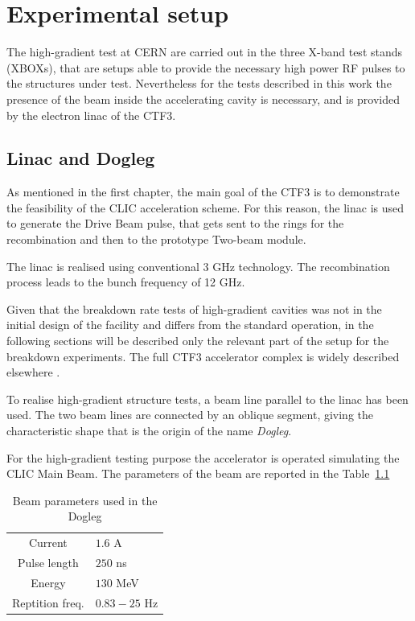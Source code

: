 \chapter[Experimental setup]{Experimental setup}
\label{chap:setup}

The high-gradient test at CERN are carried out in the three X-band test stands (XBOXs), that are setups able to provide the necessary high power RF pulses to the structures under test. Nevertheless for the tests described in this work the presence of the beam inside the accelerating cavity is necessary, and is provided by the electron linac of the CTF3. 


\section[Linac and dogleg]{Linac and Dogleg}

As mentioned in the first chapter, the main goal of the CTF3 is to demonstrate the feasibility of the CLIC acceleration scheme. For this reason, the linac is used to generate the Drive Beam pulse, that gets sent to the rings for the recombination and then to the prototype Two-beam module. 

The linac is realised using conventional 3 GHz technology. The recombination process leads to the bunch frequency of 12 GHz. 

Given that the breakdown rate tests of high-gradient cavities was not in the initial design of the facility and differs from the standard operation, in the following sections will be described only the relevant part of the setup for the breakdown experiments. The full CTF3 accelerator complex is widely described elsewhere \cite{CLIC:cdr,CTF:drive_beam,ctf3:dr}. 

To realise high-gradient structure tests, a beam line parallel to the linac has been used. The two beam lines are connected by an oblique segment, giving the characteristic shape that is the origin of the name \textit{Dogleg}.

For the high-gradient testing purpose the accelerator is operated simulating the CLIC Main Beam. The parameters of the beam are reported in the Table~\ref{beam_par_dogleg}


\begin{table}
  \centering
    \begin{tabular}{ c l }
    \hline
    \hline
    Current 		&	$1.6$ A\\
    Pulse length		&	$250$ ns\\
    Energy			&	$130$ MeV\\
    Reptition freq.	&	$0.83-25$ Hz\\
    \hline
    \hline
    \end{tabular}
\caption{Beam parameters used in the Dogleg \cite{NavarroQuirante:2025954}}
\label{beam_par_dogleg}
\end{table}



